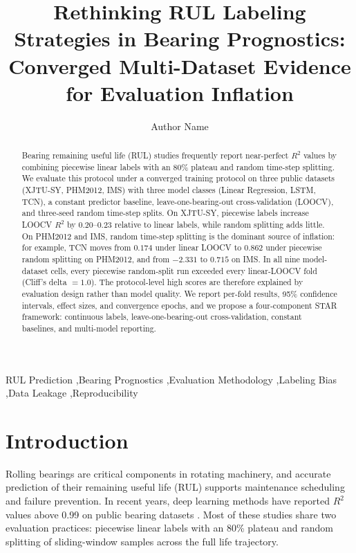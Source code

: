\documentclass[5p,twocolumn]{elsarticle}
\begin{document}
\begin{frontmatter}

\title{Rethinking RUL Labeling Strategies in Bearing Prognostics: Converged Multi-Dataset Evidence for Evaluation Inflation}

\author[1]{Author Name}
\address[1]{School of Mechanical Engineering, University, City, Country}

\begin{abstract}
Bearing remaining useful life (RUL) studies frequently report near-perfect $R^2$ values by combining piecewise linear labels with an 80\% plateau and random time-step splitting. We evaluate this protocol under a converged training protocol on three public datasets (XJTU-SY, PHM2012, IMS) with three model classes (Linear Regression, LSTM, TCN), a constant predictor baseline, leave-one-bearing-out cross-validation (LOOCV), and three-seed random time-step splits. On XJTU-SY, piecewise labels increase LOOCV $R^2$ by $0.20$--$0.23$ relative to linear labels, while random splitting adds little. On PHM2012 and IMS, random time-step splitting is the dominant source of inflation: for example, TCN moves from $0.174$ under linear LOOCV to $0.862$ under piecewise random splitting on PHM2012, and from $-2.331$ to $0.715$ on IMS. In all nine model-dataset cells, every piecewise random-split run exceeded every linear-LOOCV fold (Cliff's delta $= 1.0$). The protocol-level high scores are therefore explained by evaluation design rather than model quality. We report per-fold results, 95\% confidence intervals, effect sizes, and convergence epochs, and we propose a four-component STAR framework: continuous labels, leave-one-bearing-out cross-validation, constant baselines, and multi-model reporting.
\end{abstract}

\begin{keyword}
RUL Prediction \sep Bearing Prognostics \sep Evaluation Methodology \sep Labeling Bias \sep Data Leakage \sep Reproducibility
\end{keyword}

\end{frontmatter}

\section{Introduction}
Rolling bearings are critical components in rotating machinery, and accurate prediction of their remaining useful life (RUL) supports maintenance scheduling and failure prevention. In recent years, deep learning methods have reported $R^2$ values above 0.99 on public bearing datasets \cite{li2020multiscale,zhang2020lstm,chen2021gru,mo2022transformer}. Most of these studies share two evaluation practices: piecewise linear labels with an 80\% plateau and random splitting of sliding-window samples across the full life trajectory.
\end{document}
